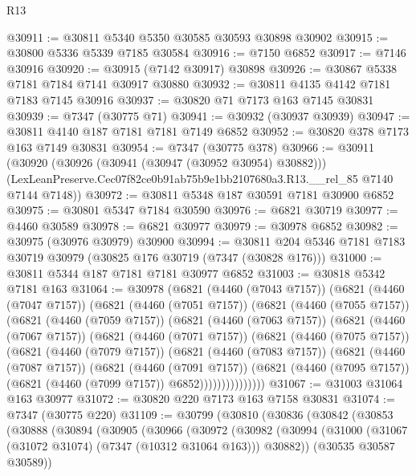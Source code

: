 \begin{lexlean}{R13}
\begin{coremodule}
@30911 := @30811 @5340 @5350 @30585 @30593 @30898 @30902
@30915 := @30800 @5336 @5339 @7185 @30584
@30916 := @7150 @6852
@30917 := @7146 @30916
@30920 := @30915 (@7142 @30917) @30898
@30926 := @30867 @5338 @7181 @7184 @7141 @30917 @30880
@30932 := @30811 @4135 @4142 @7181 @7183 @7145 @30916
@30937 := @30820 @71 @7173 @163 @7145 @30831
@30939 := @7347 (@30775 @71)
@30941 := @30932 (@30937 @30939)
@30947 := @30811 @4140 @187 @7181 @7181 @7149 @6852
@30952 := @30820 @378 @7173 @163 @7149 @30831
@30954 := @7347 (@30775 @378)
@30966 := @30911
    (@30920
      (@30926 (@30941 (@30947 (@30952 @30954) @30882)))
      (LexLeanPreserve.Cec07f82ce0b91ab75b9e1bb2107680a3.R13.__rel_85 @7140 @7144 @7148))
@30972 := @30811 @5348 @187 @30591 @7181 @30900 @6852
@30975 := @30801 @5347 @7184 @30590
@30976 := @6821 @30719
@30977 := @4460 @30589
@30978 := @6821 @30977
@30979 := @30978 @6852
@30982 := @30975 (@30976 @30979) @30900
@30994 := @30811 @204 @5346 @7181 @7183 @30719 @30979 (@30825 @176 @30719 (@7347 (@30828 @176)))
@31000 := @30811 @5344 @187 @7181 @7181 @30977 @6852
@31003 := @30818 @5342 @7181 @163
@31064 := @30978
    (@6821
      (@4460 (@7043 @7157))
      (@6821
        (@4460 (@7047 @7157))
        (@6821
          (@4460 (@7051 @7157))
          (@6821
            (@4460 (@7055 @7157))
            (@6821
              (@4460 (@7059 @7157))
              (@6821
                (@4460 (@7063 @7157))
                (@6821
                  (@4460 (@7067 @7157))
                  (@6821
                    (@4460 (@7071 @7157))
                    (@6821
                      (@4460 (@7075 @7157))
                      (@6821
                        (@4460 (@7079 @7157))
                        (@6821
                          (@4460 (@7083 @7157))
                          (@6821
                            (@4460 (@7087 @7157))
                            (@6821
                              (@4460 (@7091 @7157))
                              (@6821
                                (@4460 (@7095 @7157))
                                (@6821 (@4460 (@7099 @7157)) @6852)))))))))))))))
@31067 := @31003 @31064 @163 @30977
@31072 := @30820 @220 @7173 @163 @7158 @30831
@31074 := @7347 (@30775 @220)
@31109 := @30799
    (@30810
      (@30836
        (@30842
          (@30853
            (@30888
              (@30894
                (@30905
                  (@30966
                    (@30972
                      (@30982
                        (@30994
                          (@31000 (@31067 (@31072 @31074) (@7347 (@10312 @31064 @163))) @30882))
                        (@30535 @30587 @30589))

\end{coremodule}
\end{lexlean}
